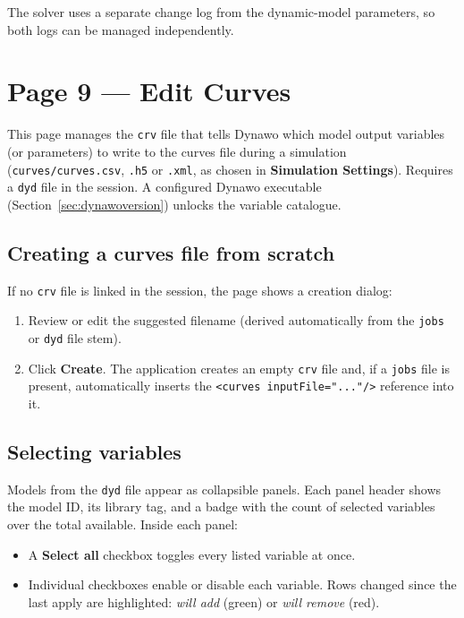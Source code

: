 \documentclass[a4paper,11pt]{article}
\newcommand{\code}[1]{\texttt{\small #1}}
\newcommand{\ftype}[1]{\texttt{\small\color{rteblu}#1}}
\begin{document}
The solver uses a separate change log from the dynamic-model parameters, so
both logs can be managed independently.

\section{Page 9 --- Edit Curves}
\label{sec:editcurves}

This page manages the \ftype{crv} file that tells Dynawo which model output
variables (or parameters) to write to the curves file during a simulation
(\code{curves/curves.csv}, \code{.h5} or \code{.xml}, as chosen in
\textbf{Simulation Settings}). Requires a \ftype{dyd} file in the session. A configured Dynawo
executable (Section~\ref{sec:dynawoversion}) unlocks the variable catalogue.

\subsection{Creating a curves file from scratch}

If no \ftype{crv} file is linked in the session, the page shows a creation
dialog:

\begin{enumerate}[leftmargin=2em]
  \item Review or edit the suggested filename (derived automatically from the
    \ftype{jobs} or \ftype{dyd} file stem).
  \item Click \textbf{Create}. The application creates an empty \ftype{crv}
    file and, if a \ftype{jobs} file is present, automatically inserts the
    \code{<curves inputFile="..."/>} reference into it.
\end{enumerate}

\subsection{Selecting variables}

Models from the \ftype{dyd} file appear as collapsible panels. Each panel
header shows the model ID, its library tag, and a badge with the count of
selected variables over the total available. Inside each panel:

\begin{itemize}[leftmargin=2em]
  \item A \textbf{Select all} checkbox toggles every listed variable at once.
  \item Individual checkboxes enable or disable each variable. Rows changed
    since the last apply are highlighted: \emph{will add} (green) or
    \emph{will remove} (red).
\end{itemize}
\end{document}
